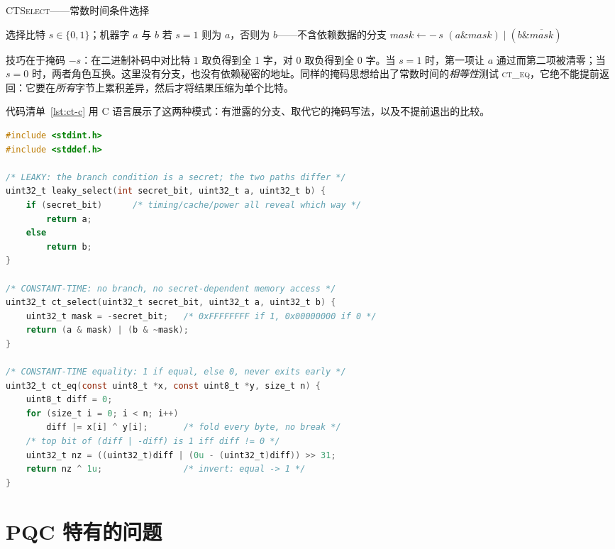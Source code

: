 \begin{algorithm}[H]
\caption{\textsc{CTSelect}——常数时间条件选择}
\label{alg:ctselect}
\begin{algorithmic}[1]
\Require 选择比特 $s \in \{0,1\}$；机器字 $a$ 与 $b$
\Ensure 若 $s=1$ 则为 $a$，否则为 $b$——不含依赖数据的分支
\State $mask \gets -\,s$
\State \Return $(a \mathbin{\&} mask) \mathbin{|} (b \mathbin{\&} \overline{mask})$
\end{algorithmic}
\end{algorithm}

技巧在于掩码 $-s$：在二进制补码中对比特 $1$ 取负得到全 1 字，对 $0$ 取负得到全 0 字。当 $s=1$ 时，第一项让 $a$ 通过而第二项被清零；当 $s=0$ 时，两者角色互换。这里没有分支，也没有依赖秘密的地址。同样的掩码思想给出了常数时间的\emph{相等性}测试 \textsc{ct\_eq}，它绝不能提前返回：它要在\emph{所有}字节上累积差异，然后才将结果压缩为单个比特。

代码清单~\ref{lst:ct-c} 用 C 语言展示了这两种模式：有泄露的分支、取代它的掩码写法，以及不提前退出的比较。

\begin{lstlisting}[language=C,label=lst:ct-c,caption={Leaky versus constant-time patterns in C.}]
#include <stdint.h>
#include <stddef.h>

/* LEAKY: the branch condition is a secret; the two paths differ */
uint32_t leaky_select(int secret_bit, uint32_t a, uint32_t b) {
    if (secret_bit)      /* timing/cache/power all reveal which way */
        return a;
    else
        return b;
}

/* CONSTANT-TIME: no branch, no secret-dependent memory access */
uint32_t ct_select(uint32_t secret_bit, uint32_t a, uint32_t b) {
    uint32_t mask = -secret_bit;   /* 0xFFFFFFFF if 1, 0x00000000 if 0 */
    return (a & mask) | (b & ~mask);
}

/* CONSTANT-TIME equality: 1 if equal, else 0, never exits early */
uint32_t ct_eq(const uint8_t *x, const uint8_t *y, size_t n) {
    uint8_t diff = 0;
    for (size_t i = 0; i < n; i++)
        diff |= x[i] ^ y[i];       /* fold every byte, no break */
    /* top bit of (diff | -diff) is 1 iff diff != 0 */
    uint32_t nz = ((uint32_t)diff | (0u - (uint32_t)diff)) >> 31;
    return nz ^ 1u;                /* invert: equal -> 1 */
}
\end{lstlisting}

\section{PQC 特有的问题}

